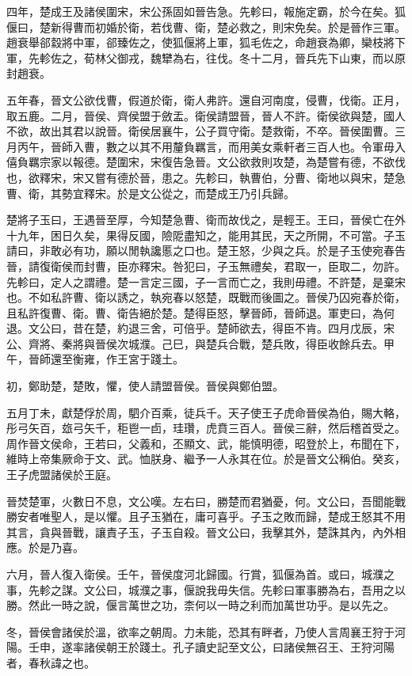 四年，楚成王及諸侯圍宋，宋公孫固如晉告急。先軫曰，報施定霸，於今在矣。狐偃曰，楚新得曹而初婚於衛，若伐曹、衛，楚必救之，則宋免矣。於是晉作三軍。趙衰舉郤縠將中軍，郤臻佐之，使狐偃將上軍，狐毛佐之，命趙衰為卿，欒枝將下軍，先軫佐之，荀林父御戎，魏犫為右，往伐。冬十二月，晉兵先下山東，而以原封趙衰。

五年春，晉文公欲伐曹，假道於衛，衛人弗許。還自河南度，侵曹，伐衛。正月，取五鹿。二月，晉侯、齊侯盟于斂盂。衛侯請盟晉，晉人不許。衛侯欲與楚，國人不欲，故出其君以說晉。衛侯居襄牛，公子買守衛。楚救衛，不卒。晉侯圍曹。三月丙午，晉師入曹，數之以其不用釐負羈言，而用美女乘軒者三百人也。令軍毋入僖負羈宗家以報德。楚圍宋，宋復告急晉。文公欲救則攻楚，為楚嘗有德，不欲伐也，欲釋宋，宋又嘗有德於晉，患之。先軫曰，執曹伯，分曹、衛地以與宋，楚急曹、衛，其勢宜釋宋。於是文公從之，而楚成王乃引兵歸。

楚將子玉曰，王遇晉至厚，今知楚急曹、衛而故伐之，是輕王。王曰，晉侯亡在外十九年，困日久矣，果得反國，險阸盡知之，能用其民，天之所開，不可當。子玉請曰，非敢必有功，願以閒執讒慝之口也。楚王怒，少與之兵。於是子玉使宛春告晉，請復衛侯而封曹，臣亦釋宋。咎犯曰，子玉無禮矣，君取一，臣取二，勿許。先軫曰，定人之謂禮。楚一言定三國，子一言而亡之，我則毋禮。不許楚，是棄宋也。不如私許曹、衛以誘之，執宛春以怒楚，既戰而後圖之。晉侯乃囚宛春於衛，且私許復曹、衛。曹、衛告絕於楚。楚得臣怒，擊晉師，晉師退。軍吏曰，為何退。文公曰，昔在楚，約退三舍，可倍乎。楚師欲去，得臣不肯。四月戊辰，宋公、齊將、秦將與晉侯次城濮。己巳，與楚兵合戰，楚兵敗，得臣收餘兵去。甲午，晉師還至衡雍，作王宮于踐土。

初，鄭助楚，楚敗，懼，使人請盟晉侯。晉侯與鄭伯盟。

五月丁未，獻楚俘於周，駟介百乘，徒兵千。天子使王子虎命晉侯為伯，賜大輅，彤弓矢百，玈弓矢千，秬鬯一卣，珪瓚，虎賁三百人。晉侯三辭，然后稽首受之。周作晉文侯命，王若曰，父義和，丕顯文、武，能慎明德，昭登於上，布聞在下，維時上帝集厥命于文、武。恤朕身、繼予一人永其在位。於是晉文公稱伯。癸亥，王子虎盟諸侯於王庭。

晉焚楚軍，火數日不息，文公嘆。左右曰，勝楚而君猶憂，何。文公曰，吾聞能戰勝安者唯聖人，是以懼。且子玉猶在，庸可喜乎。子玉之敗而歸，楚成王怒其不用其言，貪與晉戰，讓責子玉，子玉自殺。晉文公曰，我擊其外，楚誅其內，內外相應。於是乃喜。

六月，晉人復入衛侯。壬午，晉侯度河北歸國。行賞，狐偃為首。或曰，城濮之事，先軫之謀。文公曰，城濮之事，偃說我毋失信。先軫曰軍事勝為右，吾用之以勝。然此一時之說，偃言萬世之功，柰何以一時之利而加萬世功乎。是以先之。

冬，晉侯會諸侯於溫，欲率之朝周。力未能，恐其有畔者，乃使人言周襄王狩于河陽。壬申，遂率諸侯朝王於踐土。孔子讀史記至文公，曰諸侯無召王、王狩河陽者，春秋諱之也。


